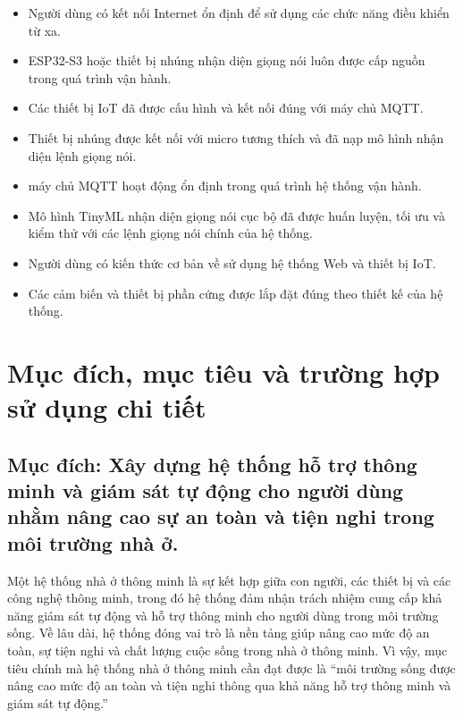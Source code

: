 \documentclass[a4paper,12pt]{article}
\begin{document}
\begin{itemize}
\item Người dùng có kết nối Internet ổn định để sử dụng các chức năng điều khiển từ xa.

\item ESP32-S3 hoặc thiết bị nhúng nhận diện giọng nói luôn được cấp nguồn trong quá trình vận hành.

\item Các thiết bị IoT đã được cấu hình và kết nối đúng với máy chủ MQTT.

\item Thiết bị nhúng được kết nối với micro tương thích và đã nạp mô hình nhận diện lệnh giọng nói.

\item máy chủ MQTT hoạt động ổn định trong quá trình hệ thống vận hành.

\item Mô hình TinyML nhận diện giọng nói cục bộ đã được huấn luyện, tối ưu và kiểm thử với các lệnh giọng nói chính của hệ thống.

\item Người dùng có kiến thức cơ bản về sử dụng hệ thống Web và thiết bị IoT.

\item Các cảm biến và thiết bị phần cứng được lắp đặt đúng theo thiết kế của hệ thống.

\end{itemize}

\section{Mục đích, mục tiêu và trường hợp sử dụng chi tiết}

\subsection{Mục đích: Xây dựng hệ thống hỗ trợ thông minh và giám sát tự động cho người dùng nhằm nâng cao sự an toàn và tiện nghi trong môi trường nhà ở. }

Một hệ thống nhà ở thông minh là sự kết hợp giữa con người, các thiết bị và các công nghệ thông minh, trong đó hệ thống đảm nhận trách nhiệm cung cấp khả năng giám sát tự động và hỗ trợ thông minh cho người dùng trong môi trường sống. Về lâu dài, hệ thống đóng vai trò là nền tảng giúp nâng cao mức độ an toàn, sự tiện nghi và chất lượng cuộc sống trong nhà ở thông minh. Vì vậy, mục tiêu chính mà hệ thống nhà ở thông minh cần đạt được là “môi trường sống được nâng cao mức độ an toàn và tiện nghi thông qua khả năng hỗ trợ thông minh và giám sát tự động.”
\end{document}
